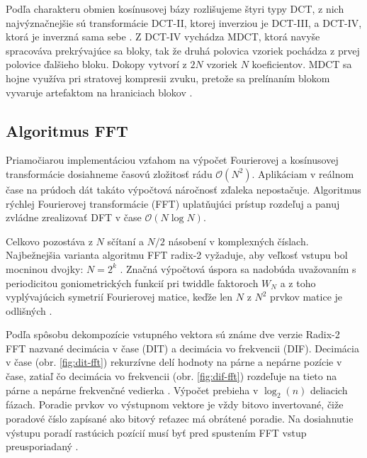 Podľa charakteru obmien kosínusovej bázy rozlišujeme štyri typy DCT,  z nich najvýznačnejšie sú transformácie DCT-II, ktorej inverziou je DCT-III, a DCT-IV, ktorá je inverzná
sama sebe \cite{dct}. Z DCT-IV vychádza MDCT, ktorá navyše spracováva prekrývajúce sa bloky, tak že druhá polovica vzoriek
pochádza z prvej polovice ďalšieho bloku. Dokopy vytvorí z $2N$ vzoriek $N$ koeficientov. MDCT sa hojne využíva pri stratovej
kompresii zvuku, pretože sa prelínaním blokom vyvaruje artefaktom na hraniciach blokov
\cite{mdct}.

\subsection{Algoritmus FFT}
Priamočiarou implementáciou vzťahom na výpočet Fourierovej a kosínusovej transformácie dosiahneme časovú zložitosť
rádu $\mathcal{O}(N^2)$. Aplikáciam v reálnom čase na prúdoch dát takáto výpočtová náročnosť zďaleka nepostačuje.
Algoritmus rýchlej Fourierovej transformácie (FFT) uplatňujúci prístup rozdeľuj a panuj zvládne zrealizovať DFT
v čase $\mathcal{O}(N \log N)$.

Celkovo pozostáva z $N$ sčítaní a $N/2$ násobení v komplexných číslach. Najbežnejšia
varianta algoritmu FFT radix-2 vyžaduje, aby veľkosť vstupu bol mocninou dvojky: $N = 2^k$ .
Značná výpočtová úspora sa nadobúda uvažovaním s periodicitou goniometrických funkcií pri twiddle faktoroch $W_N$ a z
toho vyplývajúcich symetrií Fourierovej matice, keďže len $N$ z $N^2$ prvkov matice je odlišných \cite{fft-blackbox}.

Podľa spôsobu dekompozície vstupného vektora sú známe dve verzie Radix-2 FFT nazvané decimácia v čase (DIT)
a decimácia vo frekvencii (DIF). Decimácia v čase (obr. \ref{fig:dit-fft}) rekurzívne delí hodnoty na párne a
nepárne pozície v čase, zatiaľ  čo decimácia vo frekvencii (obr. \ref{fig:dif-fft}) rozdeľuje na tieto na párne a
nepárne frekvenčné vedierka \cite{dit-dif-fft}. Výpočet prebieha v $\log_2(n)$ deliacich fázach. Poradie prvkov
vo výstupnom vektore je vždy bitovo invertované, čiže poradové číslo zapísané ako bitový reťazec má obrátené
poradie. Na dosiahnutie výstupu poradí rastúcich pozícií musí byť pred spustením FFT vstup preusporiadaný
\cite{fft-blackbox}.

